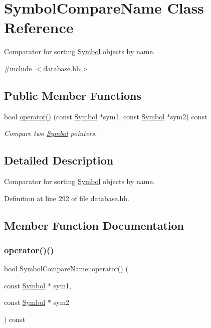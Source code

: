 \hypertarget{class_symbol_compare_name}{}\section{Symbol\+Compare\+Name Class Reference}
\label{class_symbol_compare_name}


Comparator for sorting \mbox{\hyperlink{class_symbol}{Symbol}} objects by name.  




{\ttfamily \#include $<$database.\+hh$>$}

\subsection*{Public Member Functions}
\begin{DoxyCompactItemize}
\item 
bool \mbox{\hyperlink{class_symbol_compare_name_ab3567b038314fbbb1e18f8b6537705f7}{operator()}} (const \mbox{\hyperlink{class_symbol}{Symbol}} $\ast$sym1, const \mbox{\hyperlink{class_symbol}{Symbol}} $\ast$sym2) const
\begin{DoxyCompactList}\small\item\em Compare two \mbox{\hyperlink{class_symbol}{Symbol}} pointers. \end{DoxyCompactList}\end{DoxyCompactItemize}


\subsection{Detailed Description}
Comparator for sorting \mbox{\hyperlink{class_symbol}{Symbol}} objects by name. 

Definition at line 292 of file database.\+hh.



\subsection{Member Function Documentation}
\mbox{\label{class_symbol_compare_name_ab3567b038314fbbb1e18f8b6537705f7}} 
\subsubsection{\texorpdfstring{operator()()}{operator()()}}
{\footnotesize\ttfamily bool Symbol\+Compare\+Name\+::operator() (\begin{DoxyParamCaption}\item[{const \mbox{\hyperlink{class_symbol}{Symbol}} $\ast$}]{sym1,  }\item[{const \mbox{\hyperlink{class_symbol}{Symbol}} $\ast$}]{sym2 }\end{DoxyParamCaption}) const\hspace{0.3cm}{\ttfamily [inline]}}



